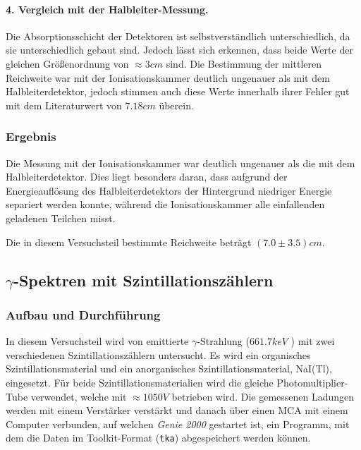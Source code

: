 \documentclass{../Misc/MontavonLaTeX/Montavon}
\begin{document}
\paragraph{4. Vergleich mit der Halbleiter-Messung.}
Die Absorptionsschicht der Detektoren ist selbstverständlich unterschiedlich, da sie unterschiedlich gebaut sind. Jedoch lässt sich erkennen, dass beide Werte der gleichen Größenordnung von $\approx 3 \unit{cm}$ sind. 
Die Bestimmung der mittleren Reichweite war mit der Ionisationskammer deutlich ungenauer als mit dem Halbleiterdetektor, jedoch stimmen auch diese Werte innerhalb ihrer Fehler gut mit dem Literaturwert von $7.18 \unit{cm}$ überein. 

\subsubsection{Ergebnis}
Die Messung mit der Ionisationskammer war deutlich ungenauer als die mit dem Halbleiterdetektor. Dies liegt besonders daran, dass aufgrund der Energieauflösung des Halbleiterdetektors der Hintergrund niedriger Energie separiert werden konnte, während die Ionisationskammer alle einfallenden geladenen Teilchen misst.

Die in diesem Versuchsteil bestimmte Reichweite beträgt $(7.0 \pm 3.5) \unit{cm}$.

\subsection{$\gamma$-Spektren mit Szintillationszählern}
\subsubsection{Aufbau und Durchführung}
In diesem Versuchsteil wird von  emittierte $\gamma$-Strahlung ($661.7 \unit{keV}$ \cite{wiki_caesium}) mit zwei verschiedenen Szintillationszählern untersucht. Es wird ein organisches Szintillationsmaterial und ein anorganisches Szintillationsmaterial, NaI(Tl), eingesetzt. 
Für beide Szintillationsmaterialien wird die gleiche Photomultiplier-Tube verwendet, welche mit $\approx 1050 \unit{V}$ betrieben wird. Die gemessenen Ladungen werden mit einem Verstärker verstärkt und danach über einen MCA mit einem Computer verbunden, auf welchen \emph{Genie 2000} gestartet ist, ein Programm, mit dem die Daten im Toolkit-Format (\texttt{tka}) abgespeichert werden können.
\end{document}
